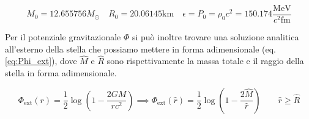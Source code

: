 \documentclass[a4paper, titlepage]{article}
\begin{document}
\begin{equation}
    M_0 = 12.655756 M_\odot \quad R_0 = 20.06145 \unit{\kilo\meter} \quad \epsilon = P_0 = \rho_0 c^2 = 150.174 \frac{\unit{\mega\electronvolt}}{c^2 \unit{\femto\meter}}
\end{equation}

Per il potenziale gravitazionale $\Phi$ si può inoltre trovare una soluzione analitica all'esterno della stella che possiamo mettere in forma adimensionale (eq. \ref{eq:Phi_ext}), dove $\hat{M}$ e $\hat R$ sono rispettivamente la massa totale e il raggio della stella in forma adimensionale.

\begin{equation}
    \Phi_\text{ext} (r) = \frac{1}{2} \log(1 - \frac{2 G M}{r c^2})
    \implies \Phi_\text{ext} (\hat r) = \frac{1}{2} \log(1 - \frac{2 \hat{M}}{\hat r}) \quad \quad \hat r \geq \hat{R}
    \label{eq:Phi_ext}
\end{equation}
\end{document}
